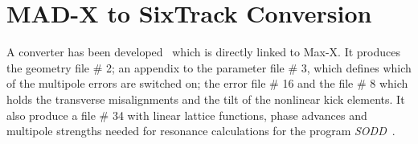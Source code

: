 \section{MAD-X to SixTrack Conversion} \label{MADT}

A converter has been developed~\cite{CONVERTOR} which is directly linked to Max-X\@.
It produces the geometry file \# 2; an appendix to the parameter file \# 3, which defines which of the multipole errors are switched on; the error file \# 16 and the file \# 8 which holds the transverse misalignments and the tilt of the nonlinear kick elements.
It also produce a file \# 34 with linear lattice functions, phase advances and multipole strengths needed for resonance calculations for the program \textit{SODD}~\cite{SODD}.






